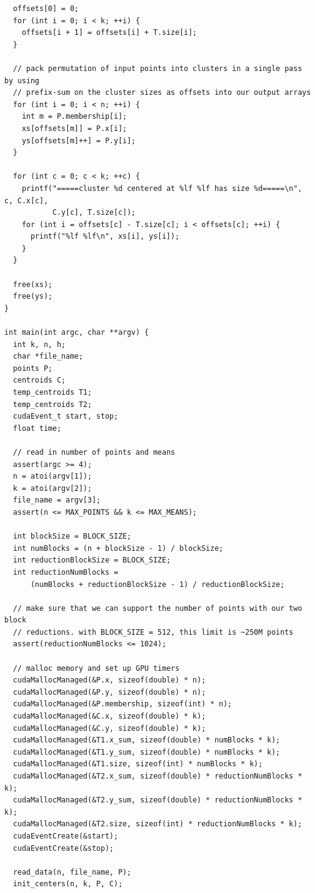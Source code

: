 \documentclass{article}
\begin{document}
\begin{lstlisting}
  offsets[0] = 0;
  for (int i = 0; i < k; ++i) {
    offsets[i + 1] = offsets[i] + T.size[i];
  }

  // pack permutation of input points into clusters in a single pass by using
  // prefix-sum on the cluster sizes as offsets into our output arrays
  for (int i = 0; i < n; ++i) {
    int m = P.membership[i];
    xs[offsets[m]] = P.x[i];
    ys[offsets[m]++] = P.y[i];
  }

  for (int c = 0; c < k; ++c) {
    printf("=====cluster %d centered at %lf %lf has size %d=====\n", c, C.x[c],
           C.y[c], T.size[c]);
    for (int i = offsets[c] - T.size[c]; i < offsets[c]; ++i) {
      printf("%lf %lf\n", xs[i], ys[i]);
    }
  }

  free(xs);
  free(ys);
}

int main(int argc, char **argv) {
  int k, n, h;
  char *file_name;
  points P;
  centroids C;
  temp_centroids T1;
  temp_centroids T2;
  cudaEvent_t start, stop;
  float time;

  // read in number of points and means
  assert(argc >= 4);
  n = atoi(argv[1]);
  k = atoi(argv[2]);
  file_name = argv[3];
  assert(n <= MAX_POINTS && k <= MAX_MEANS);

  int blockSize = BLOCK_SIZE;
  int numBlocks = (n + blockSize - 1) / blockSize;
  int reductionBlockSize = BLOCK_SIZE;
  int reductionNumBlocks =
      (numBlocks + reductionBlockSize - 1) / reductionBlockSize;

  // make sure that we can support the number of points with our two block
  // reductions. with BLOCK_SIZE = 512, this limit is ~250M points
  assert(reductionNumBlocks <= 1024);

  // malloc memory and set up GPU timers
  cudaMallocManaged(&P.x, sizeof(double) * n);
  cudaMallocManaged(&P.y, sizeof(double) * n);
  cudaMallocManaged(&P.membership, sizeof(int) * n);
  cudaMallocManaged(&C.x, sizeof(double) * k);
  cudaMallocManaged(&C.y, sizeof(double) * k);
  cudaMallocManaged(&T1.x_sum, sizeof(double) * numBlocks * k);
  cudaMallocManaged(&T1.y_sum, sizeof(double) * numBlocks * k);
  cudaMallocManaged(&T1.size, sizeof(int) * numBlocks * k);
  cudaMallocManaged(&T2.x_sum, sizeof(double) * reductionNumBlocks * k);
  cudaMallocManaged(&T2.y_sum, sizeof(double) * reductionNumBlocks * k);
  cudaMallocManaged(&T2.size, sizeof(int) * reductionNumBlocks * k);
  cudaEventCreate(&start);
  cudaEventCreate(&stop);

  read_data(n, file_name, P);
  init_centers(n, k, P, C);


\end{lstlisting}
\end{document}
